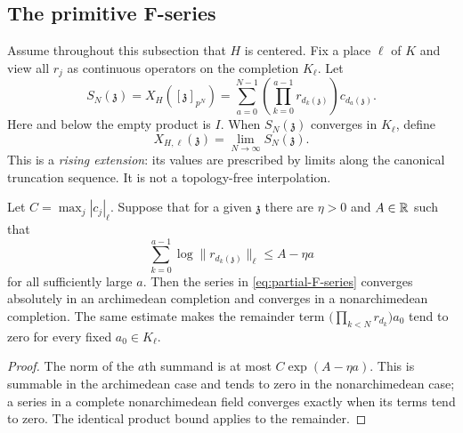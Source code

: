 \subsection{The primitive F-series}

Assume throughout this subsection that $H$ is centered.  Fix a place $\ell$
of $K$ and view all $r_j$ as continuous operators on the completion
$K_\ell$.  Let
\begin{equation}
\label{eq:partial-F-series}
 S_N(\mathfrak z)=X_H([\mathfrak z]_{p^N})
 =\sum_{a=0}^{N-1}
   \left(\prod_{k=0}^{a-1}r_{d_k(\mathfrak z)}\right)
   c_{d_a(\mathfrak z)}.
\end{equation}
Here and below the empty product is $I$.  When $S_N(\mathfrak z)$ converges
in $K_\ell$, define
\begin{equation}
\label{eq:rising-extension}
 X_{H,\ell}(\mathfrak z)=\lim_{N\to\infty}S_N(\mathfrak z).
\end{equation}
This is a \emph{rising extension}: its values are prescribed by limits along
the canonical truncation sequence.  It is not a topology-free interpolation.

\begin{proposition}
\label{prop:numen-pointwise-convergence}
Let $C=\max_j|c_j|_\ell$.  Suppose that for a given $\mathfrak z$ there are
$\eta>0$ and $A\in\mathbb R$ such that
\begin{equation}
\label{eq:negative-lyapunov}
 \sum_{k=0}^{a-1}\log\|r_{d_k(\mathfrak z)}\|_\ell
 \leq A-\eta a
\end{equation}
for all sufficiently large $a$.  Then the series in
\cref{eq:partial-F-series} converges absolutely in an archimedean completion
and converges in a nonarchimedean completion.  The same estimate makes the
remainder term
$\bigl(\prod_{k<N}r_{d_k}\bigr)a_0$ tend to zero for every fixed
$a_0\in K_\ell$.
\end{proposition}

\begin{proof}
The norm of the $a$th summand is at most
$C\exp(A-\eta a)$.  This is summable in the archimedean case and tends to
zero in the nonarchimedean case; a series in a complete nonarchimedean field
converges exactly when its terms tend to zero.  The identical product bound
applies to the remainder.
\end{proof}

